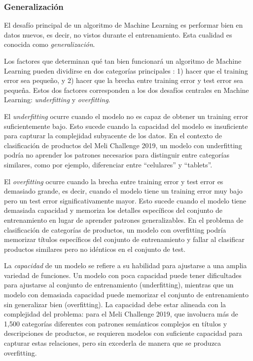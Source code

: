 \documentclass[11pt,a4paper]{article}
\begin{document}
\subsubsection{Generalización}

El desafío principal de un algoritmo de Machine Learning es performar bien en datos nuevos, es decir, no vistos durante el entrenamiento. Esta cualidad es conocida como \emph{generalización}.

Los factores que determinan qué tan bien funcionará un algoritmo de Machine Learning pueden dividirse en dos categorías principales \cite{goodfellow2016}: 1) hacer que el training error sea pequeño, y 2) hacer que la brecha entre training error y test error sea pequeña. Estos dos factores corresponden a los dos desafíos centrales en Machine Learning: \emph{underfitting} y \emph{overfitting}.

El \emph{underfitting} ocurre cuando el modelo no es capaz de obtener un training error suficientemente bajo. Esto sucede cuando la capacidad del modelo es insuficiente para capturar la complejidad subyacente de los datos. En el contexto de clasificación de productos del Meli Challenge 2019, un modelo con underfitting podría no aprender los patrones necesarios para distinguir entre categorías similares, como por ejemplo, diferenciar entre ``celulares'' y ``tablets''.

El \emph{overfitting} ocurre cuando la brecha entre training error y test error es demasiado grande, es decir, cuando el modelo tiene un training error muy bajo pero un test error significativamente mayor. Esto sucede cuando el modelo tiene demasiada capacidad y memoriza los detalles específicos del conjunto de entrenamiento en lugar de aprender patrones generalizables. En el problema de clasificación de categorías de productos, un modelo con overfitting podría memorizar títulos específicos del conjunto de entrenamiento y fallar al clasificar productos similares pero no idénticos en el conjunto de test.

La \emph{capacidad} de un modelo se refiere a su habilidad para ajustarse a una amplia variedad de funciones. Un modelo con poca capacidad puede tener dificultades para ajustarse al conjunto de entrenamiento (underfitting), mientras que un modelo con demasiada capacidad puede memorizar el conjunto de entrenamiento sin generalizar bien (overfitting). La capacidad debe estar alineada con la complejidad del problema: para el Meli Challenge 2019, que involucra más de 1,500 categorías diferentes con patrones semánticos complejos en títulos y descripciones de productos, se requieren modelos con suficiente capacidad para capturar estas relaciones, pero sin excederla de manera que se produzca overfitting.
\end{document}
